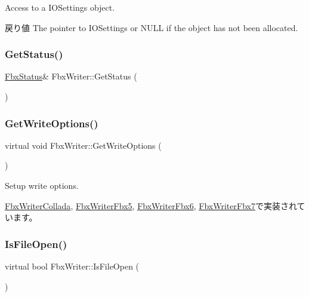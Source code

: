 Access to a I\+O\+Settings object. \begin{DoxyReturn}{戻り値}
The pointer to I\+O\+Settings or {\ttfamily N\+U\+LL} {\ttfamily if} the object has not been allocated. 
\end{DoxyReturn}
\mbox{\label{class_fbx_writer_a688d905ebbebe4536f31c87b55edf67b}} 
\subsubsection{\texorpdfstring{Get\+Status()}{GetStatus()}}
{\footnotesize\ttfamily \hyperlink{class_fbx_status}{Fbx\+Status}\& Fbx\+Writer\+::\+Get\+Status (\begin{DoxyParamCaption}{ }\end{DoxyParamCaption})}

\mbox{\label{class_fbx_writer_ad237f5cd183ae29f744aee32b7aa5525}} 
\subsubsection{\texorpdfstring{Get\+Write\+Options()}{GetWriteOptions()}}
{\footnotesize\ttfamily virtual void Fbx\+Writer\+::\+Get\+Write\+Options (\begin{DoxyParamCaption}{ }\end{DoxyParamCaption})\hspace{0.3cm}{\ttfamily [pure virtual]}}

Setup write options. 

\hyperlink{class_fbx_writer_collada_a64fdc18e00335c37acf279a5ef0d3711}{Fbx\+Writer\+Collada}, \hyperlink{class_fbx_writer_fbx5_ad86d4ec0c944e5c552286fdcbd7ff86d}{Fbx\+Writer\+Fbx5}, \hyperlink{class_fbx_writer_fbx6_a62f398d8ed2746ea076481d920f481e4}{Fbx\+Writer\+Fbx6}, \hyperlink{class_fbx_writer_fbx7_a881561770b711a6419b45fbe81e4ee94}{Fbx\+Writer\+Fbx7}で実装されています。

\mbox{\label{class_fbx_writer_ab70be3aaebd304af11cdce5e225cce68}} 
\subsubsection{\texorpdfstring{Is\+File\+Open()}{IsFileOpen()}}
{\footnotesize\ttfamily virtual bool Fbx\+Writer\+::\+Is\+File\+Open (\begin{DoxyParamCaption}{ }\end{DoxyParamCaption})\hspace{0.3cm}{\ttfamily [pure virtual]}}

